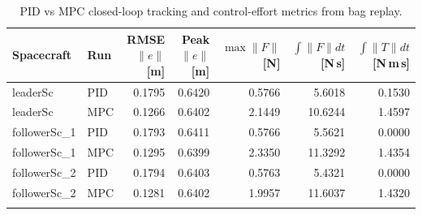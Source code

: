 \begin{table}[H]
\centering
\small
\begin{tabular}{l l r r r r r}
\toprule
Spacecraft & Run & RMSE $\|e\|$ [m] & Peak $\|e\|$ [m] & $\max\|F\|$ [N] & $\int\|F\|dt$ [N\,s] & $\int\|T\|dt$ [N\,m\,s]\\
\midrule
leaderSc & PID & 0.1795 & 0.6420 & 0.5766 & 5.6018 & 0.1530\\
leaderSc & MPC & 0.1266 & 0.6402 & 2.1449 & 10.6244 & 1.4597\\
\addlinespace
followerSc\_1 & PID & 0.1793 & 0.6411 & 0.5766 & 5.5621 & 0.0000\\
followerSc\_1 & MPC & 0.1295 & 0.6399 & 2.3350 & 11.3292 & 1.4354\\
\addlinespace
followerSc\_2 & PID & 0.1794 & 0.6403 & 0.5763 & 5.4321 & 0.0000\\
followerSc\_2 & MPC & 0.1281 & 0.6402 & 1.9957 & 11.6037 & 1.4320\\
\addlinespace
\bottomrule
\end{tabular}
\caption{PID vs MPC closed-loop tracking and control-effort metrics from bag replay.}
\label{tab:pid-mpc-compare}
\end{table}
